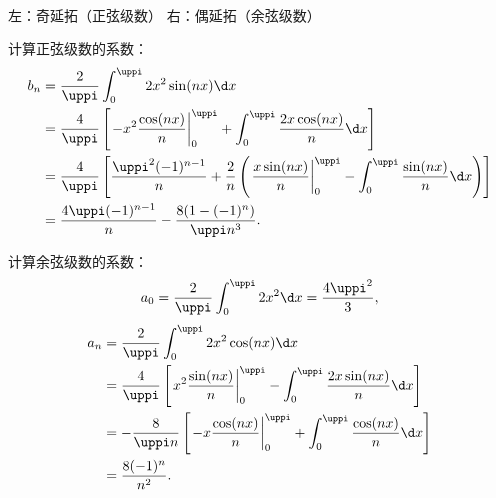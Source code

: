 \begin{solution}
\begin{center}
        \\
        \small 左：奇延拓（正弦级数） \qquad\qquad 右：偶延拓（余弦级数）
    \end{center}

    计算正弦级数的系数：
    \begin{equation}
        \begin{aligned}
            b_n & = \frac{2}{\uppi} \int_{0}^{\uppi} 2x^2 \sin(nx) \d x                                                                                                                                 \\
                & = \frac{4}{\uppi} \left[ \left. -x^2 \frac{\cos(nx)}{n} \right|_{0}^{\uppi} + \int_{0}^{\uppi} \frac{2x \cos(nx)}{n} \d x \right]                                                     \\
                & = \frac{4}{\uppi} \left[ \frac{\uppi^2 (-1)^{n-1}}{n} + \frac{2}{n} \left( \left. \frac{x \sin(nx)}{n} \right|_{0}^{\uppi} - \int_{0}^{\uppi} \frac{\sin(nx)}{n} \d x \right) \right] \\
                & = \frac{4\uppi (-1)^{n-1}}{n} - \frac{8(1 - (-1)^n)}{\uppi n^3}.
        \end{aligned}
    \end{equation}

    计算余弦级数的系数：
    \begin{equation}
        a_0 = \frac{2}{\uppi} \int_{0}^{\uppi} 2x^2 \d x = \frac{4\uppi^2}{3},
    \end{equation}
    \begin{equation}
        \begin{aligned}
            a_n & = \frac{2}{\uppi} \int_{0}^{\uppi} 2x^2 \cos(nx) \d x                                                                            \\
                & = \frac{4}{\uppi} \left[ \left. x^2 \frac{\sin(nx)}{n} \right|_{0}^{\uppi} - \int_{0}^{\uppi} \frac{2x \sin(nx)}{n} \d x \right] \\
                & = -\frac{8}{\uppi n} \left[ \left. -x \frac{\cos(nx)}{n} \right|_{0}^{\uppi} + \int_{0}^{\uppi} \frac{\cos(nx)}{n} \d x \right]  \\
                & = \frac{8 (-1)^n}{n^2}.
        \end{aligned}
    \end{equation}


\end{solution}
